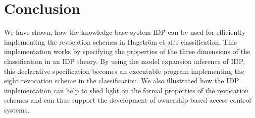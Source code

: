 \documentclass[runningheads]{llncs}
\begin{document}
\makeatletter{}\section{Conclusion}
\label{conclusion}

We have shown, how the knowledge base system IDP can be used for efficiently implementing the revocation schemes in Hagstr\"om et al.'s \cite{Hagstrom} classification. This implementation works by specifying the properties of the three dimensions of the classification in an IDP theory. By using the model expansion inference of IDP, this declarative specification becomes an executable program implementing the eight revocation scheme in the classification. We also illustrated how the IDP implementation can help to shed light on the formal properties of the revocation schemes and can thus support the development of ownership-based access control systems. 



\end{document}
